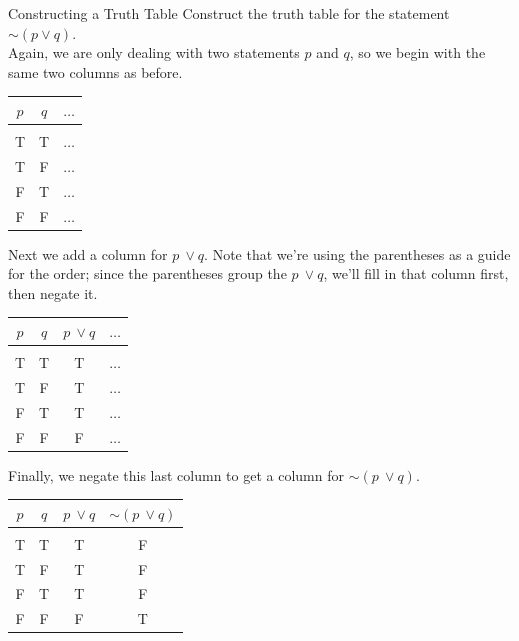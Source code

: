 \begin{example}[https://www.youtube.com/watch?v=nzBClGWo8Po]{Constructing a Truth Table}
Construct the truth table for the statement $\sim (p \vee q)$.\\

\sol
Again, we are only dealing with two statements $p$ and $q$, so we begin with the same two columns as before.
\begin{center}
\begin{tabular}{|c c c|}
\hline
$p$ & $q$ & $\ldots$\\
\hline
& &\\
T & T & $\ldots$\\
T & F & $\ldots$\\
F & T & $\ldots$\\
F & F & $\ldots$\\
\hline
\end{tabular}
\end{center}

Next we add a column for $p\ \vee q$.  Note that we're using the parentheses as a guide for the order; since the parentheses group the $p\ \vee q$, we'll fill in that column first, then negate it.
\begin{center}
\begin{tabular}{|c c c c|}
\hline
$p$ & $q$ & $p\ \vee q$ & $\ldots$\\
\hline
& & &\\
T & T & T & $\ldots$\\
T & F & T & $\ldots$\\
F & T & T & $\ldots$\\
F & F & F & $\ldots$\\
\hline
\end{tabular}
\end{center}
\pagebreak

Finally, we negate this last column to get a column for $\sim (p\ \vee q)$.
\begin{center}
{\color{green!30!black}
\begin{tabular}{|c c c c|}
\hline
$p$ & $q$ & $p\ \vee q$ & $\sim (p\ \vee q)$\\
\hline
& & &\\
T & T & T & F\\
T & F & T & F\\
F & T & T & F\\
F & F & F & T\\
\hline
\end{tabular}}
\end{center}
\end{example}

